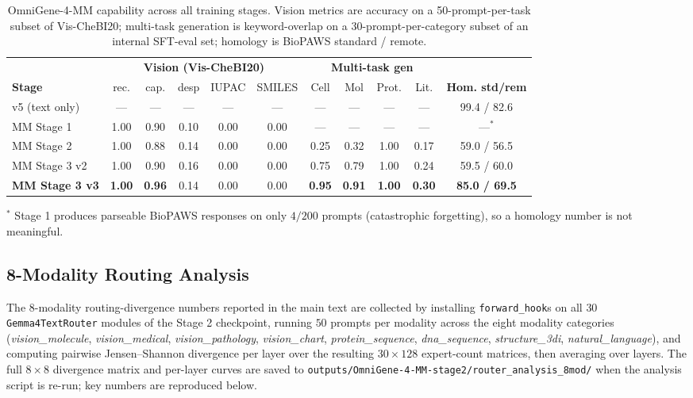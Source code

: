 \documentclass[11pt]{article}
\begin{document}
\begin{table}[H]
\centering
\small
\caption{OmniGene-4-MM capability across all training stages. Vision metrics
are accuracy on a 50-prompt-per-task subset of Vis-CheBI20; multi-task
generation is keyword-overlap on a 30-prompt-per-category subset of an
internal SFT-eval set; homology is BioPAWS standard / remote.}
\label{tab:supp-stage-progression}
\begin{tabular}{l c c c c c c c c c c}
\toprule
& \multicolumn{5}{c}{\textbf{Vision (Vis-CheBI20)}} & \multicolumn{4}{c}{\textbf{Multi-task gen}} & \\
\cmidrule(lr){2-6} \cmidrule(lr){7-10}
\textbf{Stage} & rec. & cap. & desp & IUPAC & SMILES & Cell & Mol & Prot. & Lit. & \textbf{Hom. std/rem} \\
\midrule
v5 (text only)        & ---  & ---  & ---  & ---  & ---  & ---  & ---  & ---  & ---  & 99.4 / 82.6 \\
MM Stage 1            & 1.00 & 0.90 & 0.10 & 0.00 & 0.00 & ---  & ---  & ---  & ---  & ---$^{\ast}$ \\
MM Stage 2            & 1.00 & 0.88 & 0.14 & 0.00 & 0.00 & 0.25 & 0.32 & 1.00 & 0.17 & 59.0 / 56.5 \\
MM Stage 3 v2         & 1.00 & 0.90 & 0.16 & 0.00 & 0.00 & 0.75 & 0.79 & 1.00 & 0.24 & 59.5 / 60.0 \\
\textbf{MM Stage 3 v3} & \textbf{1.00} & \textbf{0.96} & 0.14 & 0.00 & 0.00 & \textbf{0.95} & \textbf{0.91} & \textbf{1.00} & \textbf{0.30} & \textbf{85.0 / 69.5} \\
\bottomrule
\end{tabular}

\vspace{1ex}
\footnotesize
$^{\ast}$ Stage 1 produces parseable BioPAWS responses on only $4/200$ prompts
(catastrophic forgetting), so a homology number is not meaningful.
\end{table}

\subsection{8-Modality Routing Analysis}

The 8-modality routing-divergence numbers reported in the main text are
collected by installing \texttt{forward\_hook}s on all $30$
\texttt{Gemma4TextRouter} modules of the Stage 2 checkpoint, running $50$
prompts per modality across the eight modality categories
(\textit{vision\_molecule}, \textit{vision\_medical}, \textit{vision\_pathology},
\textit{vision\_chart}, \textit{protein\_sequence}, \textit{dna\_sequence},
\textit{structure\_3di}, \textit{natural\_language}), and computing pairwise
Jensen--Shannon divergence per layer over the resulting $30 \times 128$
expert-count matrices, then averaging over layers. The full $8 \times 8$
divergence matrix and per-layer curves are saved to
\texttt{outputs/OmniGene-4-MM-stage2/router\_analysis\_8mod/} when the
analysis script is re-run; key numbers are reproduced below.
\end{document}
